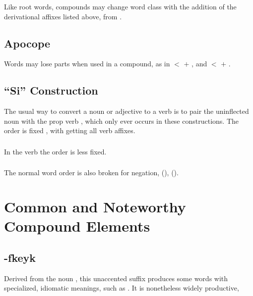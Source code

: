 \subsubsection{} Like root words, compounds may change word class with
the addition of the derivational affixes listed above,
  from  .


\subsection{Apocope} Words may lose parts when used in a compound, as
in   $<$   $+$
 , and   $<$
  $+$  .


\subsection{``Si'' Construction} The usual way to convert a noun or
adjective to a verb is to pair the uninflected noun with the prop verb
, which only ever occurs in these constructions.  The order is
fixed , with  getting all verb affixes.\label{lingop:si-const}

\subsubsection{} In the verb   the order is
less fixed.

\subsubsection{} The normal  word order is also broken for
negation,   (),
  ().


\section{Common and Noteworthy Compound Elements}

\subsection{-fkeyk} Derived from the noun  , this unaccented suffix produces some words with
specialized, idiomatic meanings, such as 
.  It is nonetheless widely productive,  

